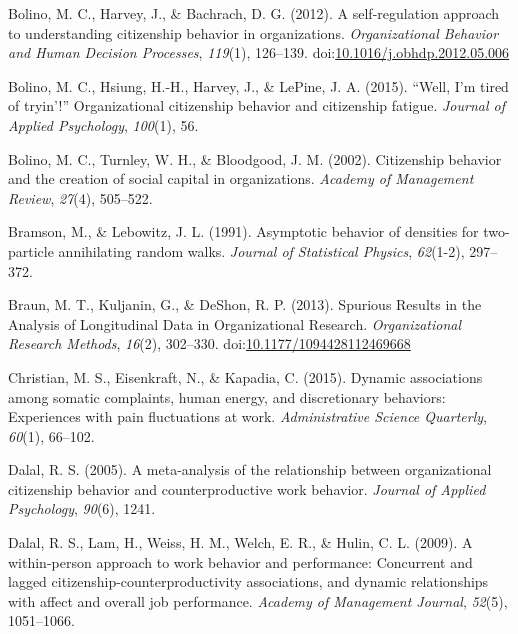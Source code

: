 \documentclass[english,,man]{apa6}
\theoremstyle{definition}
\theoremstyle{definition}
\theoremstyle{definition}
\theoremstyle{remark}
\begin{document}
\leavevmode\hypertarget{ref-bolino_self-regulation_2012}{}%
Bolino, M. C., Harvey, J., \& Bachrach, D. G. (2012). A self-regulation
approach to understanding citizenship behavior in organizations.
\emph{Organizational Behavior and Human Decision Processes},
\emph{119}(1), 126--139.
doi:\href{https://doi.org/10.1016/j.obhdp.2012.05.006}{10.1016/j.obhdp.2012.05.006}

\leavevmode\hypertarget{ref-bolino_well_2015}{}%
Bolino, M. C., Hsiung, H.-H., Harvey, J., \& LePine, J. A. (2015).
``Well, I'm tired of tryin'!'' Organizational citizenship behavior and
citizenship fatigue. \emph{Journal of Applied Psychology},
\emph{100}(1), 56.

\leavevmode\hypertarget{ref-bolino_citizenship_2002}{}%
Bolino, M. C., Turnley, W. H., \& Bloodgood, J. M. (2002). Citizenship
behavior and the creation of social capital in organizations.
\emph{Academy of Management Review}, \emph{27}(4), 505--522.

\leavevmode\hypertarget{ref-bramson1991asymptotic}{}%
Bramson, M., \& Lebowitz, J. L. (1991). Asymptotic behavior of densities
for two-particle annihilating random walks. \emph{Journal of Statistical
Physics}, \emph{62}(1-2), 297--372.

\leavevmode\hypertarget{ref-braun_spurious_2013}{}%
Braun, M. T., Kuljanin, G., \& DeShon, R. P. (2013). Spurious Results in
the Analysis of Longitudinal Data in Organizational Research.
\emph{Organizational Research Methods}, \emph{16}(2), 302--330.
doi:\href{https://doi.org/10.1177/1094428112469668}{10.1177/1094428112469668}

\leavevmode\hypertarget{ref-christian2015dynamic}{}%
Christian, M. S., Eisenkraft, N., \& Kapadia, C. (2015). Dynamic
associations among somatic complaints, human energy, and discretionary
behaviors: Experiences with pain fluctuations at work.
\emph{Administrative Science Quarterly}, \emph{60}(1), 66--102.

\leavevmode\hypertarget{ref-dalal2005meta}{}%
Dalal, R. S. (2005). A meta-analysis of the relationship between
organizational citizenship behavior and counterproductive work behavior.
\emph{Journal of Applied Psychology}, \emph{90}(6), 1241.

\leavevmode\hypertarget{ref-dalal_within-person_2009}{}%
Dalal, R. S., Lam, H., Weiss, H. M., Welch, E. R., \& Hulin, C. L.
(2009). A within-person approach to work behavior and performance:
Concurrent and lagged citizenship-counterproductivity associations, and
dynamic relationships with affect and overall job performance.
\emph{Academy of Management Journal}, \emph{52}(5), 1051--1066.
\end{document}
